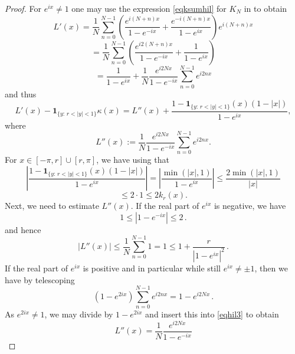 \begin{proof}
For $e^{ix}\neq 1$
one may use the expression
\eqref{eqksumhil} for $K_N$
in  to obtain
\begin{equation*}
    {L'}(x)= \frac 1N\sum_{n=0}^{N-1}
     \left(\frac{e^{i(N+n)x}}{1-e^{-ix}}
      +\frac {e^{-i(N+n)x}}{1-e^{ix}}\right) e^{i(N+n)x}
\end{equation*}
\begin{equation*}
    = \frac 1N\sum_{n=0}^{N-1}
    \left(\frac{e^{i2(N+n)x}}{1-e^{-ix}}
      +\frac {1}{1-e^{ix}}\right)
\end{equation*}
\begin{equation}\label{eqhil3}
    = \frac{1}{1-e^{ix}} +
     \frac 1N \frac {e^{i2Nx}}{1-e^{-ix}}
     \sum_{n=0}^{N-1}
    {e^{i2nx}}
\end{equation}
and thus
\begin{equation}
\label{eq-L'L''}
  {L'}(x) -\mathbf{1}_{\{y:\, r<|y|<1\}}\kappa(x)=L''(x)+ \frac{1-\mathbf{1}_{{\{y:\, r<|y|<1\}}}(x)(1-|x|)}{1-e^{ix}},
\end{equation}
where
$$L''(x):=\frac 1N \frac {e^{i2Nx}}{1-e^{-ix}}
     \sum_{n=0}^{N-1}
    {e^{i2nx}}.$$
For $x\in [-\pi, r]\cup [r, \pi]$, we have using  that
\begin{equation*}
   \left|\frac{1-\mathbf{1}_{{\{y:\, r<|y|<1\}}}(x)(1-|x|)}{1-e^{ix}} \right|=\left|\frac{\min(|x|, 1)}{1-e^{ix}} \right|\leq \frac{2\min(|x|, 1)}{|x|}
\end{equation*}
\begin{equation}
 \label{eq-diffzero2}
    \leq 2\cdot 1\leq 2 k_r(x).
\end{equation}
Next, we need to estimate $L''(x)$. If the real part of
$e^{ix}$ is negative, we have
\begin{equation}
  1\le |1-e^{-ix}|\le 2\, .
\end{equation}
and hence
\begin{equation}\label{eqhil12}
    |L''(x)|\le
     \frac 1N
     \sum_{n=0}^{N-1}
    1=1\le 1+\frac r{|1-e^{ix}|^2}\, .
\end{equation}
If the real part of $e^{ix}$ is positive and in particular while still $e^{ix}\neq \pm 1$, then we have by telescoping
\begin{equation}
 (1-e^{2ix})
     \sum_{n=0}^{N-1}
    {e^{i2nx}}=1-e^{i2Nx}\, .
\end{equation}
As $e^{2ix}\neq 1$, we may divide by $1-e^{2ix}$ and insert this into
\eqref{eqhil3} to obtain
\begin{equation}
 L''(x)=
           \frac 1N \frac {e^{i2Nx}}{1-e^{-ix}}

\end{equation}
\end{proof}
